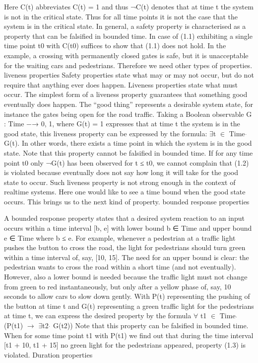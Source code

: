 Here C(t) abbreviates C(t) = 1 and thus ¬C(t) denotes that at time
t the system is not in the critical state. Thus for all time points it
is not the case that the system is in the critical state.
In general, a safety property is characterised as a property that can be falsified in bounded time. In case of (1.1) exhibiting a single
time point t0 with C(t0) suffices to show that (1.1) does not hold.
In the example, a crossing with permanently closed gates is safe,
but it is unacceptable for the waiting cars and pedestrians. Therefore
we need other types of properties.
liveness properties
Safety properties state what may or may not occur,
but do not require that anything ever does happen. Liveness properties state what must occur. The simplest form of a liveness property guarantees that something good eventually does happen. The
“good thing” represents a desirable system state, for instance the
gates being open for the road traffic. Taking a Boolean observable
G : Time −→ {0, 1}, where G(t) = 1 expresses that at time t the
system is in the good state, this liveness property can be expressed
by the formula: 
$\exists$t $\in$ Time $\dot{}$ G(t).
In other words, there exists a time point in which the system is in the
good state. Note that this property cannot be falsified in bounded
time. If for any time point t0 only ¬G(t) has been observed for
t ≤ t0, we cannot complain that (1.2) is violated because eventually
does not say how long it will take for the good state to occur.
Such liveness property is not strong enough in the context of realtime systems. Here one would like to see a time bound when the
good state occurs. This brings us to the next kind of property.
bounded response properties

A bounded response property states that
a desired system reaction to an input occurs within a time interval
[b, e] with lower bound b ∈ Time and upper bound e ∈ Time where
b ≤ e. For example, whenever a pedestrian at a traffic light pushes
the button to cross the road, the light for pedestrians should turn
green within a time interval of, say, [10, 15]. The need for an upper
bound is clear: the pedestrian wants to cross the road within a short
time (and not eventually). However, also a lower bound is needed
because the traffic light must not change from green to red instantaneously, but only after a yellow phase of, say, 10 seconds to allow
cars to slow down gently.
With P(t) representing the pushing of the button at time t and
G(t) representing a green traffic light for the pedestrians at time t,
we can express the desired property by the formula
$\forall$ t1 $\in$ Time $\dot{}$ (P(t1) $\rightarrow$ $\exists$t2 \in [t1 + 10, t1 + 15] $\dot{}$ G(t2))
Note that this property can be falsified in bounded time. When
for some time point t1 with P(t1) we find out that during the time
interval [t1 + 10, t1 + 15] no green light for the pedestrians appeared,
property (1.3) is violated.
Duration properties

